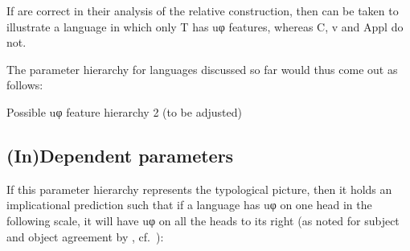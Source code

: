 \documentclass[output=paper]{langsci/langscibook}
\begin{document}
If \citet{JenksEtAl2017} are correct in their analysis of the relative
construction, then  can be taken to illustrate a language in which only T
has uφ features, whereas C, v and Appl do not.

The parameter hierarchy for  languages discussed so far would thus come
out as follows:

\ea Possible uφ feature hierarchy 2 (to be adjusted)
\z

\subsection{(In)Dependent parameters}\label{sub:3.3.3}

If this parameter hierarchy represents the typological picture, then it holds
an implicational prediction such that if a language has uφ on one head in the
following scale, it will have uφ on all the heads to its right (as noted for
subject and object
agreement by \citealt{Moravcsik1974}, cf.\
\citealt{Givon1976,Bobaljik2008}):
\end{document}
